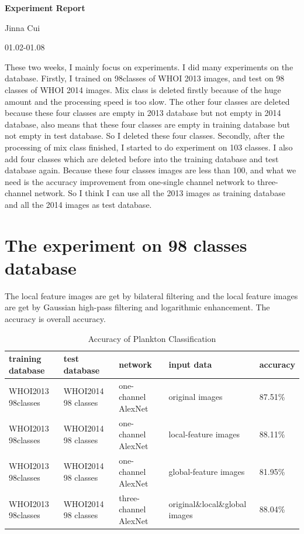 \documentclass{article}
\begin{document}


\pagestyle{fancy}
\begin{center}
\textbf{\LARGE{Experiment Report}} %
\end{center}

\begin{center}
Jinna Cui
\end{center}

\begin{center}
01.02-01.08
\end{center}
These two weeks, I mainly focus on experiments. I did many experiments on the database. Firstly, I trained on 98classes of WHOI 2013 images, and test on 98 classes of WHOI 2014 images. Mix class is deleted firstly because of the huge amount and the processing speed is too slow. The other four classes are deleted because these four classes are empty in 2013 database but not empty in 2014 database, also means that these four classes are empty in training database but not empty in test database. So I deleted these four classes. Secondly, after the processing of mix class finished, I started to do experiment on 103 classes. I also add four classes which are deleted before into the training database and test database again. Because these four classes images are less than 100, and what we need is the accuracy improvement from one-single channel network to three-channel network. So I think I can use all the 2013 images as training database and all the 2014 images as test database. 
\section{The experiment on 98 classes database}
The local feature images are get by bilateral filtering and the local feature images are get by Gaussian high-pass filtering and logarithmic enhancement. The accuracy is overall accuracy. 

\begin{table}[!ht]
  \caption{Accuracy of Plankton Classification}
  \centering
  \begin{tabular}{lllll}
    \toprule
    \cmidrule{1-5}
    training database &test database &network  &input data   &accuracy  \\
    \midrule
    WHOI2013 98classes &WHOI2014 98 classes & one-channel AlexNet &original images   & 87.51\% \\ \hline
    WHOI2013 98classes &WHOI2014 98 classes  &one-channel  AlexNet &local-feature images & 88.11\%  \\ \hline
    WHOI2013 98classes &WHOI2014 98 classes  &one-channel  AlexNet &global-feature images   & 81.95\% \\ \hline
    WHOI2013 98classes &WHOI2014 98 classes  &three-channel  AlexNet &original\&local\&global images   & 88.04\% \\
    \bottomrule
  \end{tabular}
\end{table}
\end{document}
